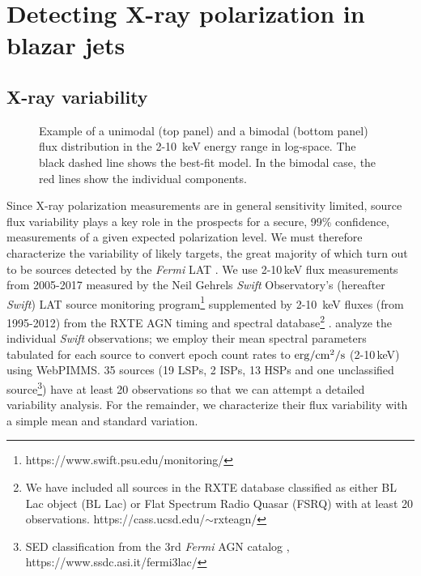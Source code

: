 \section{Detecting X-ray polarization in blazar jets}

\subsection{X-ray variability}
\label{sec:xray_var}

\begin{figure}
\centering
\caption{Example of a unimodal (top panel) and a bimodal (bottom panel) flux distribution in 
the 2-10~keV energy range in log-space. The black dashed line shows the best-fit model. In the bimodal case, 
the red lines show the individual components.}
\label{fig:example_hist}
\end{figure}

Since X-ray polarization measurements are in general sensitivity limited, source flux variability
plays a key role in the prospects for a secure, 99\% confidence, measurements of a given expected
polarization level. We must therefore characterize the variability of likely targets, the great
majority of which turn out to be sources detected by the {\it Fermi} LAT \citep{acero_fermi_2015}. 
We use 2-10\,keV flux measurements from 2005-2017 measured by the
Neil Gehrels {\it Swift} Observatory's (hereafter {\it Swift}) LAT source monitoring 
program\footnote{https://www.swift.psu.edu/monitoring/} \citep{strohmayer_statistical_2013} supplemented by 
2-10~keV fluxes (from 1995-2012) from the RXTE AGN timing and spectral 
database\footnote{We have included all sources in the RXTE database
classified as either BL Lac object (BL Lac) or Flat Spectrum Radio Quasar (FSRQ) with at least 20 observations. https://cass.ucsd.edu/$\sim$rxteagn/} \citep{rivers_full_2013}. 
\citet{strohmayer_statistical_2013} analyze the individual {\it Swift} observations; we employ their mean 
spectral parameters tabulated for each source to convert epoch count rates to $\rm erg/cm^2/s$ (2-10\,keV) using WebPIMMS. 35 sources (19 LSPs, 2 ISPs, 13 HSPs and one unclassified source\footnote{SED classification from the
3rd {\it Fermi} AGN catalog \cite{acero_fermi_2015}, https://www.ssdc.asi.it/fermi3lac/}) have at least
20 observations so that we can attempt a detailed variability analysis. For the remainder, we characterize
their flux variability with a simple mean and standard variation.

